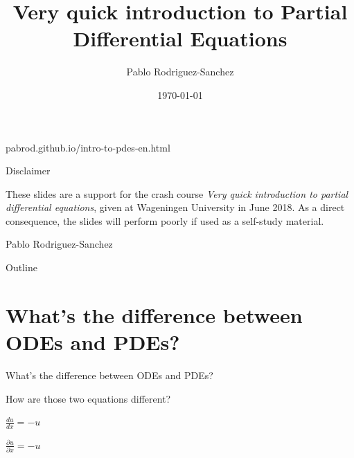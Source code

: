 \documentclass{beamer}
\title{Very quick introduction to Partial Differential Equations}
\author{Pablo Rodriguez-Sanchez}
\institute{Wageningen University and Research}
\date{\today}
\begin{document}
\begin{frame}
  \titlepage
  
  \begin{center}
  \end{center}
  
  \begin{center}
  pabrod.github.io/intro-to-pdes-en.html
  \end{center}
  
\end{frame}

\begin{frame}{Disclaimer}

These slides are a support for the crash course \textit{Very quick introduction to partial differential equations}, given at Wageningen University in June 2018. As a direct consequence, the slides will perform poorly if used as a self-study material.

\begin{flushright}
Pablo Rodriguez-Sanchez
\end{flushright}

\end{frame}

\begin{frame}{Outline}
 \tableofcontents
\end{frame}

\section{What's the difference between ODEs and PDEs?}

  \begin{frame}{What's the difference between ODEs and PDEs?}

    How are those two equations different?

    \begin{center}
    $\frac{du}{dx} = -u$
    \end{center}

    \begin{center}
    $\frac{\partial u}{\partial x} = -u$
    \end{center}

  \end{frame}
\end{document}
